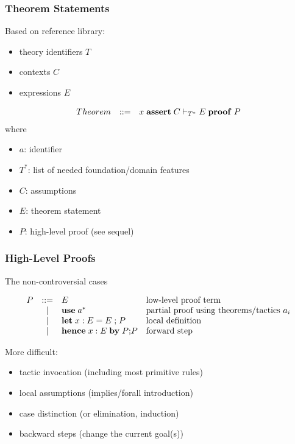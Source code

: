 \documentclass{beamer}
\begin{document}
\begin{frame}\frametitle{Theorem Statements}
Based on reference library:
\begin{itemize}
\item theory identifiers $T$
\item contexts $C$
\item expressions $E$ 
\end{itemize}

\[
\begin{array}{lcl}
Theorem &::=& x\;\mathbf{assert}\;C\vdash_{T^*} E \; \mathbf{proof}\; P
\end{array}
\]
where
\begin{itemize}
\item $a$: identifier
\item $T^*$: list of needed foundation/domain features
\item $C$: assumptions 
\item $E$: theorem statement
\item $P$: high-level proof (see sequel)
\end{itemize}
\end{frame}

\begin{frame}\frametitle{High-Level Proofs}
The non-controversial cases

\[
\begin{array}{lcll}
P       &::=& E & \text{low-level proof term}\\
        &|&   \mathbf{use}\; a^* & \text{partial proof using theorems/tactics $a_i$}\\
        &|&   \mathbf{let}\; x:E=E\; \mathbf{;}\; P & \text{local definition}\\
        &|&   \mathbf{hence}\;x:E\; \mathbf{by}\; P\mathbf{;} P & \text{forward step} \\
\end{array}
\]

More difficult:
\begin{itemize}
\item tactic invocation (including most primitive rules)
\item local assumptions (implies/forall introduction)
\item case distinction (or elimination, induction)
\item backward steps (change the current goal(s))
\end{itemize}
\end{frame}
\end{document}
